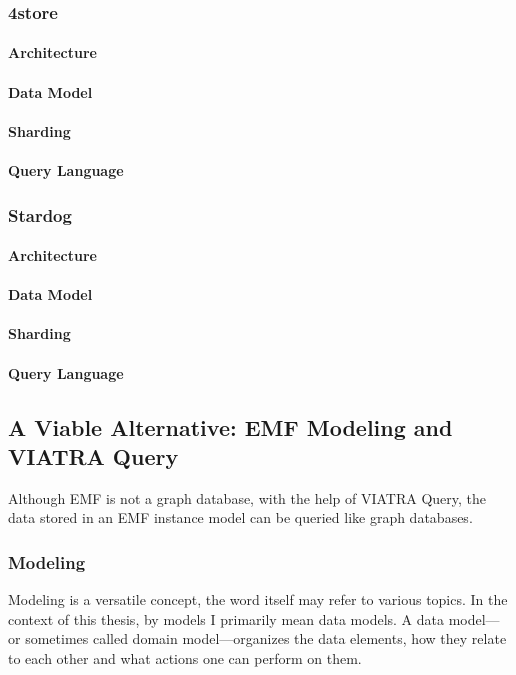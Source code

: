 \subsubsection{4store}
\paragraph{Architecture}
\paragraph{Data Model}
\paragraph{Sharding}
\paragraph{Query Language}


\subsubsection{Stardog}
\paragraph{Architecture}
\paragraph{Data Model}
\paragraph{Sharding}
\paragraph{Query Language}

\subsection{A Viable Alternative: EMF Modeling and VIATRA Query}
Although EMF is not a graph database, with the help of VIATRA Query, the data stored in an EMF instance model can be queried like graph databases.

\subsubsection{Modeling}
Modeling is a versatile concept, the word itself may refer to various topics. In the context of this thesis, by models I primarily mean data models. A data model---or sometimes called domain model---organizes the data elements, how they relate to each other and what actions one can perform on them.

